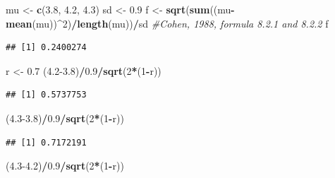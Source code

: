 \documentclass[]{article}
\newenvironment{Shaded}{\begin{snugshade}}{\end{snugshade}}
\newcommand{\KeywordTok}[1]{\textcolor[rgb]{0.13,0.29,0.53}{\textbf{#1}}}
\newcommand{\DecValTok}[1]{\textcolor[rgb]{0.00,0.00,0.81}{#1}}
\newcommand{\FloatTok}[1]{\textcolor[rgb]{0.00,0.00,0.81}{#1}}
\newcommand{\StringTok}[1]{\textcolor[rgb]{0.31,0.60,0.02}{#1}}
\newcommand{\CommentTok}[1]{\textcolor[rgb]{0.56,0.35,0.01}{\textit{#1}}}
\newcommand{\OperatorTok}[1]{\textcolor[rgb]{0.81,0.36,0.00}{\textbf{#1}}}
\newcommand{\NormalTok}[1]{#1}
\begin{document}
\begin{Shaded}
\begin{Highlighting}[]
\NormalTok{mu <-}\StringTok{ }\KeywordTok{c}\NormalTok{(}\FloatTok{3.8}\NormalTok{, }\FloatTok{4.2}\NormalTok{, }\FloatTok{4.3}\NormalTok{)}
\NormalTok{sd <-}\StringTok{ }\FloatTok{0.9}
\NormalTok{f <-}\StringTok{ }\KeywordTok{sqrt}\NormalTok{(}\KeywordTok{sum}\NormalTok{((mu}\OperatorTok{-}\KeywordTok{mean}\NormalTok{(mu))}\OperatorTok{^}\DecValTok{2}\NormalTok{)}\OperatorTok{/}\KeywordTok{length}\NormalTok{(mu))}\OperatorTok{/}\NormalTok{sd }\CommentTok{#Cohen, 1988, formula 8.2.1 and 8.2.2}
\NormalTok{f}
\end{Highlighting}
\end{Shaded}

\begin{verbatim}
## [1] 0.2400274
\end{verbatim}

\begin{Shaded}
\begin{Highlighting}[]
\NormalTok{r <-}\StringTok{ }\FloatTok{0.7}
\NormalTok{(}\FloatTok{4.2-3.8}\NormalTok{)}\OperatorTok{/}\FloatTok{0.9}\OperatorTok{/}\KeywordTok{sqrt}\NormalTok{(}\DecValTok{2}\OperatorTok{*}\NormalTok{(}\DecValTok{1}\OperatorTok{-}\NormalTok{r))}
\end{Highlighting}
\end{Shaded}

\begin{verbatim}
## [1] 0.5737753
\end{verbatim}

\begin{Shaded}
\begin{Highlighting}[]
\NormalTok{(}\FloatTok{4.3-3.8}\NormalTok{)}\OperatorTok{/}\FloatTok{0.9}\OperatorTok{/}\KeywordTok{sqrt}\NormalTok{(}\DecValTok{2}\OperatorTok{*}\NormalTok{(}\DecValTok{1}\OperatorTok{-}\NormalTok{r))}
\end{Highlighting}
\end{Shaded}

\begin{verbatim}
## [1] 0.7172191
\end{verbatim}

\begin{Shaded}
\begin{Highlighting}[]
\NormalTok{(}\FloatTok{4.3-4.2}\NormalTok{)}\OperatorTok{/}\FloatTok{0.9}\OperatorTok{/}\KeywordTok{sqrt}\NormalTok{(}\DecValTok{2}\OperatorTok{*}\NormalTok{(}\DecValTok{1}\OperatorTok{-}\NormalTok{r))}
\end{Highlighting}
\end{Shaded}
\end{document}

